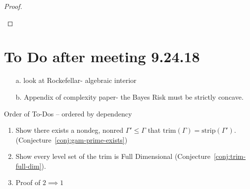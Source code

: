 \documentclass[12pt]{article}
\newcommand{\Comments}{1}
\newcommand{\mynote}[2]{\ifnum\Comments=1\textcolor{#1}{#2}\fi}
\newcommand{\jessie}[1]{\mynote{purple}{[JF: #1]}}
\newcommand{\R}{\mathcal{R}}
\newcommand{\inter}[1]{\mathring{#1}}%
\newcommand{\trim}{\mathrm{trim}}
\newcommand{\strip}{\mathrm{strip}}
\begin{document}
\begin{proof}
\begin{enumerate}
%
%
%


\end{enumerate} 

\end{proof}

\section{To Do after meeting 9.24.18}


\begin{enumerate}
\item[a.] look at Rockefellar- algebraic interior

\item[b.] Appendix of complexity paper- the Bayes Risk must be strictly concave.
\end{enumerate}

Order of To-Dos -- ordered by dependency
\begin{enumerate}
\item Show there exists a nondeg, nonred $\Gamma' \leq \Gamma$ that $\trim(\Gamma) = \strip(\Gamma')$. (Conjecture~\ref{conj:gam-prime-exists}) 
\item Show every level set of the trim is Full Dimensional (Conjecture~\ref{conj:trim-full-dim}).
\item Proof of $2 \implies 1$
\end{enumerate}
\end{document}
